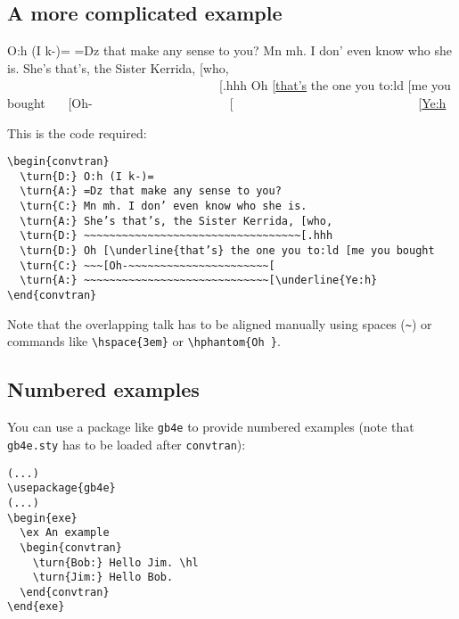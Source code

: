 \documentclass[a4paper]{article}
\begin{document}
\subsection{A more complicated example}
\begin{convtran}
   O:h (I k-)=
   =Dz that make any sense to you?
   Mn mh. I don’ even know who she is.
   She’s that’s, the Sister Kerrida, [who,
   ~~~~~~~~~~~~~~~~~~~~~~~~~~~~~~~~~~[.hhh
   Oh [\underline{that’s} the one you to:ld [me you bought
   ~~~[Oh-~~~~~~~~~~~~~~~~~~~~~~[
   ~~~~~~~~~~~~~~~~~~~~~~~~~~~~~[\underline{Ye:h}
\end{convtran}
This is the code required:
\begin{verbatim}
\begin{convtran}
  \turn{D:} O:h (I k-)=
  \turn{A:} =Dz that make any sense to you?
  \turn{C:} Mn mh. I don’ even know who she is.
  \turn{A:} She’s that’s, the Sister Kerrida, [who,
  \turn{D:} ~~~~~~~~~~~~~~~~~~~~~~~~~~~~~~~~~~[.hhh
  \turn{D:} Oh [\underline{that’s} the one you to:ld [me you bought
  \turn{C:} ~~~[Oh-~~~~~~~~~~~~~~~~~~~~~~[
  \turn{A:} ~~~~~~~~~~~~~~~~~~~~~~~~~~~~~[\underline{Ye:h}
\end{convtran}
\end{verbatim}
Note that the overlapping talk has to be aligned manually using spaces
(\verb!~!) or commands like \verb!\hspace{3em}! or \verb!\hphantom{Oh }!.

\subsection{Numbered examples}
You can use a package like \verb!gb4e! to provide numbered examples (note that \verb!gb4e.sty! has to be loaded after \verb!convtran!):
\begin{verbatim}
(...)
\usepackage{gb4e}
(...)
\begin{exe}
  \ex An example
  \begin{convtran}
    \turn{Bob:} Hello Jim. \hl
    \turn{Jim:} Hello Bob.
  \end{convtran}
\end{exe}
\end{verbatim}
\end{document}
